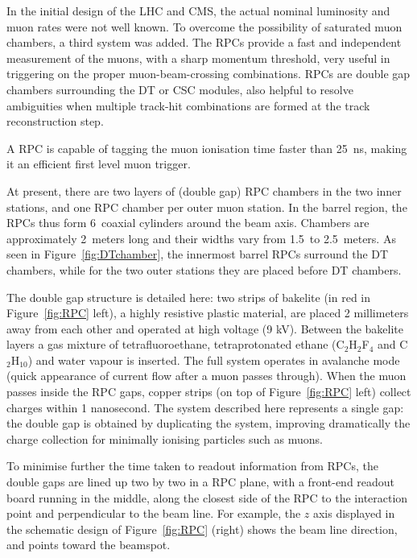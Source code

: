 


In the initial design of the LHC and CMS, the actual nominal
luminosity and muon rates were not well known. To overcome the
possibility of saturated muon chambers, a third system was added. The
RPCs provide a fast and independent measurement of the muons, with
a sharp momentum threshold, very useful in triggering on the proper
muon-beam-crossing combinations. RPCs are double gap chambers
surrounding the DT or CSC modules, also helpful to resolve ambiguities when
multiple track-hit combinations are formed at the track reconstruction
step.

A RPC is capable of tagging the muon ionisation time faster than 25~ns, making it an efficient first level muon trigger.


At present, there are two layers of (double gap) RPC chambers in the
two inner stations, and one RPC chamber per outer muon station. In the
barrel region, the RPCs thus form 6~coaxial cylinders around the beam
axis. Chambers are approximately 2~meters long and their widths vary
from 1.5~to 2.5~meters. As seen in Figure~\ref{fig:DTchamber}, the
innermost barrel RPCs surround the DT chambers, while for the two
outer stations they are placed before DT chambers.


The double gap structure is detailed here: two strips of bakelite (in
red in Figure~\ref{fig:RPC} left), a
highly resistive plastic material, are placed 2 millimeters away from each
other and operated at high voltage (9 kV). Between the bakelite layers
a gas mixture of tetrafluoroethane, tetraprotonated ethane
(C$_2$H$_2$F$_4$ and C$_2$H$_{10}$) and water vapour is inserted. The
full system operates in avalanche mode (quick appearance of current
flow after a muon passes through). When the muon passes inside the
RPC gaps, copper strips (on top of Figure~\ref{fig:RPC} left) collect
charges within 1 nanosecond. The system described here
represents a single gap: the double gap is obtained by duplicating the
system, improving dramatically the charge collection for minimally
ionising particles such as muons. 


To minimise further the time taken to readout information from RPCs,
the double gaps are lined up two by two in a RPC plane, with a
front-end readout
board running in the middle, along the closest side of the RPC to the
interaction point and perpendicular to the beam line. For example, the
$z$ axis displayed in the schematic design of
Figure~\ref{fig:RPC} (right) shows the beam line direction, and points
toward the beamspot. 


